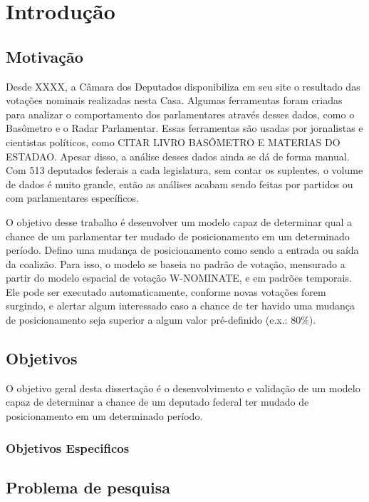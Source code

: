 \chapter{Introdução} \label{intro}

\section{Motivação}\label{sec:motivacao}

Desde XXXX, a Câmara dos Deputados disponibiliza em seu site o resultado das
votações nominais realizadas nesta Casa. Algumas ferramentas foram criadas para
analizar o comportamento dos parlamentares através desses dados, como o
Basômetro e o Radar Parlamentar. Essas ferramentas são usadas por jornalistas e
cientistas políticos, como CITAR LIVRO BASÔMETRO E MATERIAS DO ESTADAO. Apesar
disso, a análise desses dados ainda se dá de forma manual. Com 513 deputados
federais a cada legislatura, sem contar os suplentes, o volume de dados é muito
grande, então as análises acabam sendo feitas por partidos ou com parlamentares
específicos.

O objetivo desse trabalho é desenvolver um modelo capaz de determinar qual a
chance de um parlamentar ter mudado de posicionamento em um determinado
período. Defino uma mudança de posicionamento como sendo a entrada ou saída da
coalizão. Para isso, o modelo se baseia no padrão de votação, mensurado a
partir do modelo espacial de votação W-NOMINATE, e em padrões temporais. Ele
pode ser executado automaticamente, conforme novas votações forem surgindo, e
alertar algum interessado caso a chance de ter havido uma mudança de
posicionamento seja superior a algum valor pré-definido (e.x.: 80\%).

\section{Objetivos}

O objetivo geral desta dissertação é o desenvolvimento e validação de um modelo
capaz de determinar a chance de um deputado federal ter mudado de
posicionamento em um determinado período.

\subsection{Objetivos Especificos}

\section{Problema de pesquisa}

